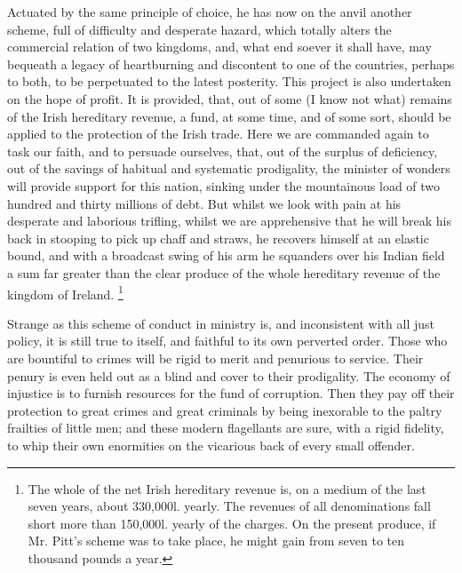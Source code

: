 Actuated by the same principle of choice, he has now on the anvil another scheme, full of difficulty and desperate hazard, which totally alters the commercial relation of two kingdoms, and, what end soever it shall have, may bequeath a legacy of heartburning and discontent to one of the countries, perhaps to both, to be perpetuated to the latest posterity. This project is also undertaken on the hope of profit. It is provided, that, out of some (I know not what) remains of the Irish hereditary revenue, a fund, at some time, and of some sort, should be applied to the protection of the Irish trade. Here we are commanded again to task our faith, and to persuade ourselves, that, out of the surplus of deficiency, out of the savings of habitual and systematic prodigality, the minister of wonders will provide support for this nation, sinking under the mountainous load of two hundred and thirty millions of debt. But whilst we look with pain at his desperate and laborious trifling, whilst we are apprehensive that he will break his back in stooping to pick up chaff and straws, he recovers himself at an elastic bound, and with a broadcast swing of his arm he squanders over his Indian field a sum far greater than the clear produce of the whole hereditary revenue of the kingdom of Ireland.
\footnote{ The whole of the net Irish hereditary revenue is, on a medium of the last seven years, about 330,000l. yearly. The revenues of all denominations fall short more than 150,000l. yearly of the charges. On the present produce, if Mr. Pitt's scheme was to take place, he might gain from seven to ten thousand pounds a year.}


Strange as this scheme of conduct in ministry is, and inconsistent with all just policy, it is still true to itself, and faithful to its own perverted order. Those who are bountiful to crimes will be rigid to merit and penurious to service. Their penury is even held out as a blind and cover to their prodigality. The economy of injustice is to furnish resources for the fund of corruption. Then they pay off their protection to great crimes and great criminals by being inexorable to the paltry frailties of little men; and these modern flagellants are sure, with a rigid fidelity, to whip their own enormities on the vicarious back of every small offender.

